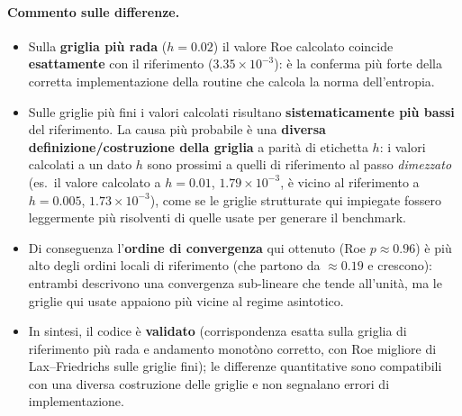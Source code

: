 \paragraph{Commento sulle differenze.}
\begin{itemize}
  \item Sulla \textbf{griglia più rada} ($h=0.02$) il valore Roe calcolato coincide
    \textbf{esattamente} con il riferimento ($3.35\times10^{-3}$): è la conferma più forte della
    corretta implementazione della routine che calcola la norma dell'entropia.
  \item Sulle griglie più fini i valori calcolati risultano \textbf{sistematicamente più bassi} del
    riferimento. La causa più probabile è una \textbf{diversa definizione/costruzione della griglia}
    a parità di etichetta $h$: i valori calcolati a un dato $h$ sono prossimi a quelli di riferimento
    al passo \emph{dimezzato} (es.\ il valore calcolato a $h=0.01$, $1.79\times10^{-3}$, è vicino al
    riferimento a $h=0.005$, $1.73\times10^{-3}$), come se le griglie strutturate qui impiegate fossero
    leggermente più risolventi di quelle usate per generare il benchmark.
  \item Di conseguenza l'\textbf{ordine di convergenza} qui ottenuto (Roe $p\approx0.96$) è più alto
    degli ordini locali di riferimento (che partono da $\approx0.19$ e crescono): entrambi descrivono
    una convergenza sub-lineare che tende all'unità, ma le griglie qui usate appaiono più vicine al
    regime asintotico.
  \item In sintesi, il codice è \textbf{validato} (corrispondenza esatta sulla griglia di
    riferimento più rada e andamento monotòno corretto, con Roe migliore di Lax--Friedrichs sulle
    griglie fini); le differenze quantitative sono compatibili con una diversa costruzione delle
    griglie e non segnalano errori di implementazione.
\end{itemize}

